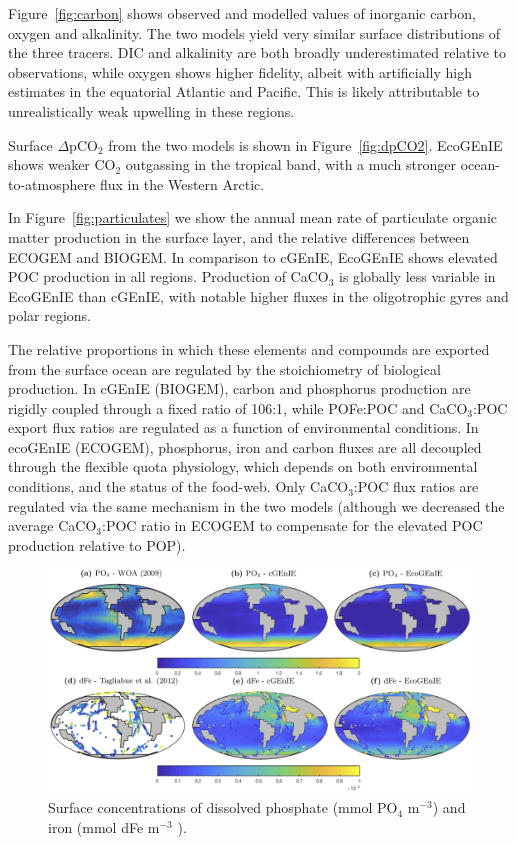 \documentclass[gmd, manuscript]{copernicus}
\begin{document}
{Figure~\ref{fig:carbon} shows observed and modelled values of inorganic carbon, oxygen and alkalinity. The two models yield very similar surface distributions of the three tracers. DIC and alkalinity are both broadly underestimated relative to observations, while oxygen shows higher fidelity, albeit with artificially high estimates in the equatorial Atlantic and Pacific. This is likely attributable to unrealistically weak upwelling in these regions. 

Surface $\Delta$pCO$_2$ from the two models is shown in Figure~\ref{fig:dpCO2}. EcoGEnIE shows weaker CO$_2$ outgassing in the tropical band, with a much stronger ocean-to-atmosphere flux in the Western Arctic. 

In Figure~\ref{fig:particulates} we show the annual mean rate of particulate organic matter production in the surface layer, and the relative differences between ECOGEM and BIOGEM. In comparison to cGEnIE, EcoGEnIE shows elevated POC production in all regions. Production of CaCO$_3$ is globally less variable in EcoGEnIE than cGEnIE, with notable higher fluxes in the oligotrophic gyres and polar regions. 

The relative proportions in which these elements and compounds are exported from the surface ocean are regulated by the stoichiometry of biological production. In cGEnIE (BIOGEM), carbon and phosphorus production are rigidly coupled through a fixed ratio of 106:1, while POFe:POC and CaCO$_3$:POC export flux ratios are regulated as a function of environmental conditions. In ecoGEnIE (ECOGEM), phosphorus, iron and carbon fluxes are all decoupled through the flexible quota physiology, which depends on both environmental conditions, and the status of the food-web. Only CaCO$_3$:POC flux ratios are regulated via the same mechanism in the two models (although we decreased the average CaCO$_3$:POC ratio in ECOGEM to compensate for the elevated POC production relative to POP). 

\begin{figure}[htp]
\includegraphics[width=0.95\linewidth]{Final_figures/Fig_2.png}
\caption{Surface concentrations of dissolved phosphate (mmol PO$_4$ m$^{-3}$) and iron (mmol dFe m$^{-3}$ ).}
\label{fig:nutrients}
\end{figure}

}
\end{document}

